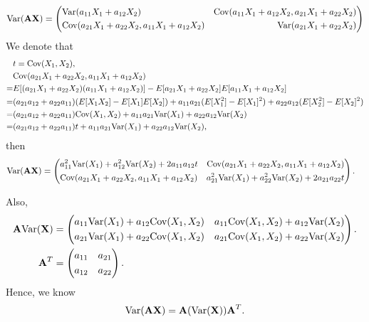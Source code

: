 {\item
\begin{align*}    
    \text{Var}(\textbf{AX})=\left(\begin{aligned}
        &\text{Var}(a_{11}X_1+a_{12}X_2) & \text{Cov}(a_{11}X_1+a_{12}X_2,a_{21}X_1+a_{22}X_2)\\
        &\text{Cov}(a_{21}X_1+a_{22}X_2,a_{11}X_1+a_{12}X_2) & \text{Var}(a_{21}X_1+a_{22}X_2)
    \end{aligned}\right)
\end{align*}
We denote that
\begin{align*}
    &t=\text{Cov}(X_1,X_2),\\
    &\text{Cov}(a_{21}X_1+a_{22}X_2,a_{11}X_1+a_{12}X_2)\\
    =&E[(a_{21}X_1+a_{22}X_2)(a_{11}X_1+a_{12}X_2)]-E[a_{21}X_1+a_{22}X_2]E[a_{11}X_1+a_{12}X_2]\\
    =&(a_{21}a_{12}+a_{22}a_{11})(E[X_1X_2]-E[X_1]E[X_2])+a_{11}a_{21}(E[X_1^2]-E[X_1]^2)+a_{22}a_{12}(E[X_2^2]-E[X_2]^2)\\
    =&(a_{21}a_{12}+a_{22}a_{11})\text{Cov}(X_1,X_2)+a_{11}a_{21}\text{Var}(X_1)+a_{22}a_{12}\text{Var}(X_2)\\
    =&(a_{21}a_{12}+a_{22}a_{11})t+a_{11}a_{21}\text{Var}(X_1)+a_{22}a_{12}\text{Var}(X_2),
\end{align*}
then
\begin{align*}
    \text{Var}(\textbf{AX})
    &=\left(\begin{aligned}
        &a_{11}^2\text{Var}(X_1)+a_{12}^2\text{Var}(X_2)+2a_{11}a_{12}t & \text{Cov}(a_{21}X_1+a_{22}X_2,a_{11}X_1+a_{12}X_2)\\
        &\text{Cov}(a_{21}X_1+a_{22}X_2,a_{11}X_1+a_{12}X_2) & a_{21}^2\text{Var}(X_1)+a_{22}^2\text{Var}(X_2)+2a_{21}a_{22}t
    \end{aligned}\right).
\end{align*}

Also,
\begin{align*}
    \textbf{A}\text{Var}(\textbf{X})&=\left(\begin{aligned}
        &a_{11}\text{Var}(X_1)+a_{12}\text{Cov}(X_1,X_2) & a_{11}\text{Cov}(X_1,X_2)+a_{12}\text{Var}(X_2)\\
        &a_{21}\text{Var}(X_1)+a_{22}\text{Cov}(X_1,X_2) & a_{21}\text{Cov}(X_1,X_2)+a_{22}\text{Var}(X_2)\\
    \end{aligned}\right).\\
    \textbf{A}^T&=\left(\begin{aligned}
        &a_{11} & a_{21}\\
        &a_{12} & a_{22}
    \end{aligned}\right).
\end{align*}
Hence, we know
\[
    \text{Var}(\textbf{AX})=\textbf{A}(\text{Var}(\textbf{X}))\textbf{A}^T.
\]

}
